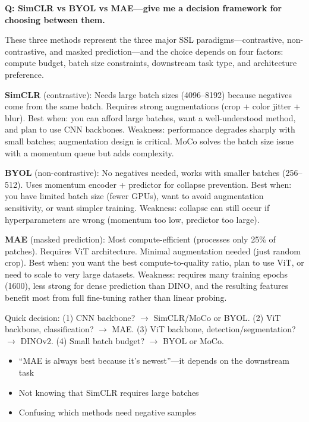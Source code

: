 \begin{interviewq}
\textbf{Q: SimCLR vs BYOL vs MAE---give me a decision framework for choosing between them.}

 \quad {} \quad \badgefreq{\freqhigh}

\stronganswer These three methods represent the three major SSL paradigms---contrastive, non-contrastive, and masked prediction---and the choice depends on four factors: compute budget, batch size constraints, downstream task type, and architecture preference.

\textbf{SimCLR} (contrastive): Needs large batch sizes (4096--8192) because negatives come from the same batch. Requires strong augmentations (crop + color jitter + blur). Best when: you can afford large batches, want a well-understood method, and plan to use CNN backbones. Weakness: performance degrades sharply with small batches; augmentation design is critical. MoCo solves the batch size issue with a momentum queue but adds complexity.

\textbf{BYOL} (non-contrastive): No negatives needed, works with smaller batches (256--512). Uses momentum encoder + predictor for collapse prevention. Best when: you have limited batch size (fewer GPUs), want to avoid augmentation sensitivity, or want simpler training. Weakness: collapse can still occur if hyperparameters are wrong (momentum too low, predictor too large).

\textbf{MAE} (masked prediction): Most compute-efficient (processes only 25\% of patches). Requires ViT architecture. Minimal augmentation needed (just random crop). Best when: you want the best compute-to-quality ratio, plan to use ViT, or need to scale to very large datasets. Weakness: requires many training epochs (1600), less strong for dense prediction than DINO, and the resulting features benefit most from full fine-tuning rather than linear probing.

Quick decision: (1) CNN backbone? $\to$ SimCLR/MoCo or BYOL. (2) ViT backbone, classification? $\to$ MAE. (3) ViT backbone, detection/segmentation? $\to$ DINOv2. (4) Small batch budget? $\to$ BYOL or MoCo.

\redflags
\begin{itemize}
    \item ``MAE is always best because it's newest''---it depends on the downstream task
    \item Not knowing that SimCLR requires large batches
    \item Confusing which methods need negative samples
\end{itemize}


\end{interviewq}
